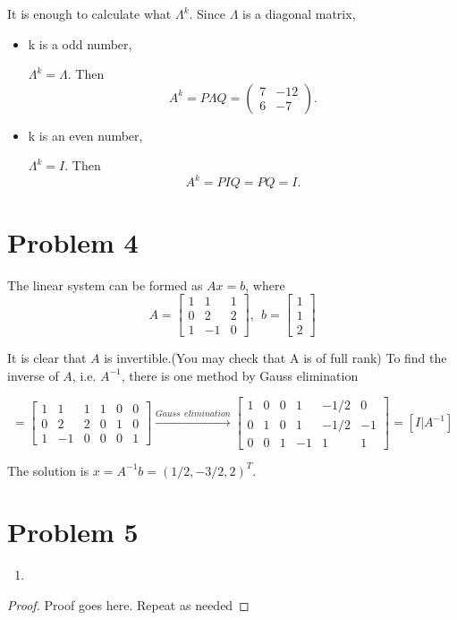 \documentclass[12pt]{article}
\begin{document}
It is enough to calculate what $\Lambda^k$. Since $\Lambda$ is a diagonal matrix, 
\begin{itemize}
\item k is a odd number, 

$\Lambda ^k = \Lambda$. Then 
\begin{equation*}
A^k = P\Lambda Q = \begin{pmatrix}
7 & -12 \\
6 & -7
\end{pmatrix}.
\end{equation*}
\item k is an even number, 

$\Lambda ^k = I$. Then 
\begin{equation*}
A^k = PIQ = PQ = I.
\end{equation*}

\end{itemize}

\section{Problem 4}

The linear system can be formed as $Ax = b$, where
\begin{equation*}
A = \begin{bmatrix}
1 & 1 & 1\\
0 & 2 & 2\\
1 & -1 & 0
\end{bmatrix}, \ \ 
b = \begin{bmatrix}
1 \\
1 \\
2
\end{bmatrix}
\end{equation*}

It is clear that $A$ is invertible.(You may check that A is of full rank)
To find the inverse of $A$, i.e. $A^{-1}$, there is one method by Gauss elimination

\begin{equation*}
[A|I] = \begin{bmatrix}
1 & 1 & 1 & 1 & 0 & 0 \\
0 & 2 & 2 & 0 & 1 & 0 \\
1 & -1 & 0 & 0 & 0 & 1
\end{bmatrix} \xrightarrow {Gauss \ \ elimination}
\begin{bmatrix}
1 & 0 & 0 & 1 & -1/2 & 0 \\
0 & 1 & 0 & 1 & -1/2 & -1 \\
0 & 0 & 1 & -1 & 1 & 1 
\end{bmatrix} = [I|A^{-1}]
\end{equation*}

The solution is $x = A^{-1}b = (1/2, -3/2, 2)^T$.


\section{Problem 5}





\begin{enumerate}
\item

\end{enumerate}


 
\begin{proof}
Proof goes here. Repeat as needed
\end{proof}
\end{document}
